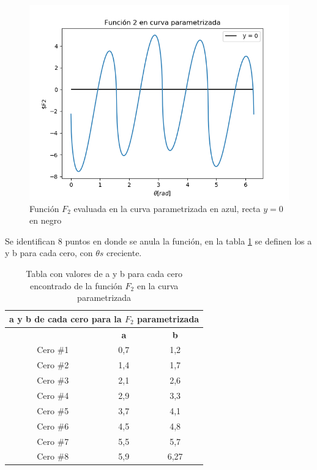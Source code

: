 \documentclass[a4paper, 11pt, spanish]{article}
\begin{document}
\begin{figure}[h]
\centering
\includegraphics[scale=0.5]{cerosf2.png}
\caption{Función $F_2$ evaluada en la curva parametrizada en azul, recta $y = 0$ en negro} 
\label{cf2}
\end{figure}

Se identifican 8 puntos en donde se anula la función, en la tabla \ref{tab} se definen los a y b para cada cero, con $\theta s$ creciente.\\

\begin{table}[h]
\centering
\caption{Tabla con valores de a y b para cada cero encontrado de la función $F_2$ en la curva parametrizada}
\label{tab}
\begin{tabular}{|c|c|c|}
\hline
\multicolumn{3}{|l|}{\textbf{a y b de cada cero para la $F_2$ parametrizada}} \\ \hline
\multicolumn{1}{|l|}{\textbf{}} & \textbf{a} & \textbf{b} \\ \hline
Cero \#1 & 0,7 & 1,2 \\ \hline
Cero \#2 & 1,4 & 1,7 \\ \hline
Cero \#3 & 2,1 & 2,6 \\ \hline
Cero \#4 & 2,9 & 3,3 \\ \hline
Cero \#5 & 3,7 & 4,1 \\ \hline
Cero \#6 & 4,5 & 4,8 \\ \hline
Cero \#7 & 5,5 & 5,7 \\ \hline
Cero \#8 & 5,9 & 6,27 \\ \hline
\end{tabular}
\end{table}
\end{document}
